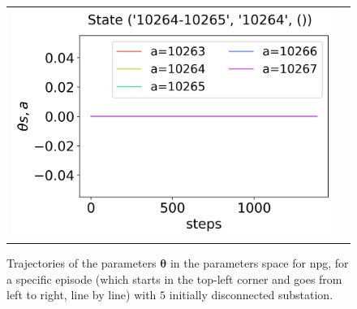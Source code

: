 \begin{figure}[!htp]
\begin{tabular}{cc}
        \hspace*{-26.7pt}\includegraphics[scale=0.36,valign=b]{chapters/figures/theta_NPG_state_3.png}
    \end{tabular}
    \caption{Trajectories of the parameters $\boldsymbol \theta$ in the parameters space for \acrshort{npg}, for a specific episode (which starts in the top-left corner and goes from left to right, line by line) with $5$ initially disconnected substation.}
    \label{fig:sequence-theta-npg}
\end{figure}

